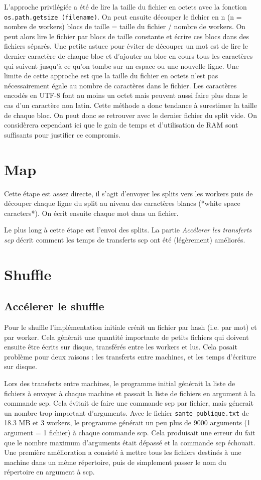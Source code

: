 \documentclass[11pt,a4paper]{article}
\begin{document}
L'approche privilégiée a été de lire la taille du fichier en octets avec la fonction \texttt{os.path.getsize (filename)}. On peut ensuite découper le fichier en n (n = nombre de workers) blocs de taille = taille du fichier / nombre de workers. On peut alors lire le fichier par blocs de taille constante et écrire ces blocs dans des fichiers séparés. Une petite astuce pour éviter de découper un mot est de lire le dernier caractère de chaque bloc et d'ajouter au bloc en cours tous les caractères qui suivent jusqu'à ce qu'on tombe sur un espace ou une nouvelle ligne. Une limite de cette approche est que la taille du fichier en octets n'est pas nécessairement égale au nombre de caractères dans le fichier. Les caractères encodés en UTF-8 font au moins un octet mais peuvent aussi faire plus dans le cas d'un caractère non latin. Cette méthode a donc tendance à surestimer la taille de chaque bloc. On peut donc se retrouver avec le dernier fichier du split vide. On considèrera cependant ici que le gain de temps et d'utilisation de RAM sont suffisants pour justifier ce compromis.

\section{Map}
Cette étape est assez directe, il s'agit d'envoyer les splits vers les workers puis de découper chaque ligne du split au niveau des caractères blancs (*white space caracters*). On écrit ensuite chaque mot dans un fichier.

Le plus long à cette étape est l'envoi des splits. La partie \textit{Accélerer les transferts scp} décrit comment les temps de transferts scp ont été (légèrement) améliorés.

\section{Shuffle}
\subsection*{Accélerer le shuffle}
Pour le shuffle l'implémentation initiale créait un fichier par hash (i.e. par mot) et par worker. Cela génèrait une quantité importante de petits fichiers qui doivent ensuite être écrits sur disque, transférés entre les workers et lus. Cela posait problème pour deux raisons : les transferts entre machines, et les temps d'écriture sur disque.

Lors des transferts entre machines, le programme initial générait la liste de fichiers à envoyer à chaque machine et passait la liste de fichiers en argument à la commande scp. Cela évitait de faire une commande scp par fichier, mais génerait un nombre trop important d'arguments. Avec le fichier \texttt{sante\_publique.txt} de 18.3 MB et 3 workers, le programme générait un peu plus de 9000 arguments (1 argument = 1 fichier) à chaque commande scp. Cela produisait une erreur du fait que le nombre maximum d'arguments était dépassé et la commande scp échouait. Une première amélioration a consisté à mettre tous les fichiers destinés à une machine dans un même répertoire, puis de simplement passer le nom du répertoire en argument à scp. 
\end{document}
